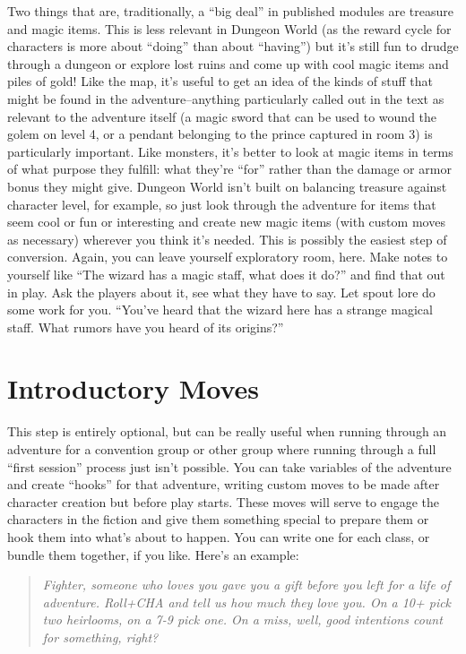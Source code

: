 Two things that are, traditionally, a ``big deal'' in published modules are treasure and magic items. This is less relevant in Dungeon World (as the reward cycle for characters is more about ``doing'' than about ``having'') but it's still fun to drudge through a dungeon or explore lost ruins and come up with cool magic items and piles of gold! Like the map, it's useful to get an idea of the kinds of stuff that might be found in the adventure--anything particularly called out in the text as relevant to the adventure itself (a magic sword that can be used to wound the golem on level 4, or a pendant belonging to the prince captured in room 3) is particularly important. Like monsters, it's better to look at magic items in terms of what purpose they fulfill: what they're ``for'' rather than the damage or armor bonus they might give. Dungeon World isn't built on balancing treasure against character level, for example, so just look through the adventure for items that seem cool or fun or interesting and create new magic items (with custom moves as necessary) wherever you think it's needed. This is possibly the easiest step of conversion. Again, you can leave yourself exploratory room, here. Make notes to yourself like ``The wizard has a magic staff, what does it do?'' and find that out in play. Ask the players about it, see what they have to say. Let spout lore do some work for you. ``You've heard that the wizard here has a strange magical staff. What rumors have you heard of its origins?''
\section*{Introductory Moves}


This step is entirely optional, but can be really useful when running through an adventure for a convention group or other group where running through a full ``first session'' process just isn't possible. You can take variables of the adventure and create ``hooks'' for that adventure, writing custom moves to be made after character creation but before play starts. These moves will serve to engage the characters in the fiction and give them something special to prepare them or hook them into what's about to happen. You can write one for each class, or bundle them together, if you like. Here's an example:

\begin{quote}
\emph{Fighter, someone who loves you gave you a gift before you left for a life of adventure. Roll+CHA and tell us how much they love you. On a 10+ pick two heirlooms, on a 7-9 pick one. On a miss, well, good intentions count for something, right?}
\end{quote}

